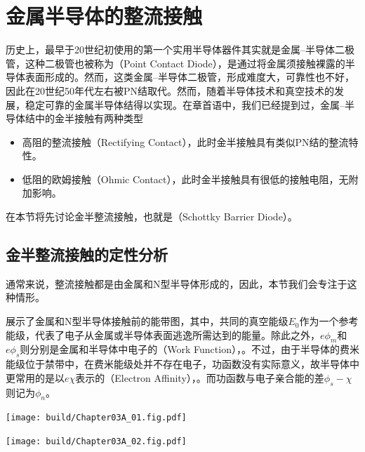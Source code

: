 \section{金属半导体的整流接触}
历史上，最早于20世纪初使用的第一个实用半导体器件其实就是金属--半导体二极管，这种二极管也被称为（Point Contact Diode），是通过将金属须接触裸露的半导体表面形成的。然而，这类金属--半导体二极管，形成难度大，可靠性也不好，因此在20世纪50年代左右被PN结取代。然而，随着半导体技术和真空技术的发展，稳定可靠的金属半导体结得以实现。在章首语中，我们已经提到过，金属--半导体结中的金半接触有两种类型
\begin{itemize}
    \item 高阻的整流接触（Rectifying Contact），此时金半接触具有类似PN结的整流特性。
    \item 低阻的欧姆接触（Ohmic Contact），此时金半接触具有很低的接触电阻，无附加影响。
\end{itemize}

在本节将先讨论金半整流接触，也就是（Schottky Barrier Diode）。

\subsection{金半整流接触的定性分析}
通常来说，整流接触都是由金属和N型半导体形成的，因此，本节我们会专注于这种情形。

展示了金属和N型半导体接触前的能带图，其中，共同的真空能级$E_0$作为一个参考能级，代表了电子从金属或半导体表面逃逸所需达到的能量。除此之外，$e\phi_m$和$e\phi_s$则分别是金属和半导体中电子的（Work Function），。不过，由于半导体的费米能级位于禁带中，在费米能级处并不存在电子，功函数没有实际意义，故半导体中更常用的是以$e\chi$表示的（Electron Affinity），。而功函数与电子亲合能的差$\phi_s-\chi$则记为$\phi_n$。

\begin{Figure}[金半整流接触的能带图]
    \begin{FigureSub}[接触前]
        \texttt{[image: build/Chapter03A\_01.fig.pdf]}
    \end{FigureSub}
    \hspace{0.5cm}
    \begin{FigureSub}[接触后]
        \texttt{[image: build/Chapter03A\_02.fig.pdf]}
    \end{FigureSub}
\end{Figure}


